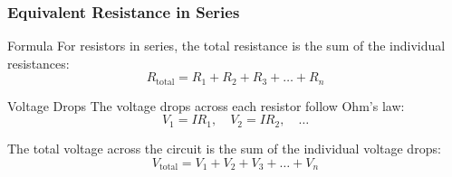 \documentclass{beamer}
\begin{document}
\begin{frame}
    \frametitle{Equivalent Resistance in Series}
    \begin{block}{Formula}
        For resistors in series, the total resistance is the sum of the individual resistances:
        \begin{equation}
            R_{\text{total}} = R_1 + R_2 + R_3 + \ldots + R_n
        \end{equation}
    \end{block}
    
    \begin{block}{Voltage Drops}
        The voltage drops across each resistor follow Ohm's law:
        \begin{equation}
            V_1 = IR_1, \quad V_2 = IR_2, \quad \ldots
        \end{equation}
        
        The total voltage across the circuit is the sum of the individual voltage drops:
        \begin{equation}
            V_{\text{total}} = V_1 + V_2 + V_3 + \ldots + V_n
        \end{equation}
    \end{block}
\end{frame}
\end{document}
